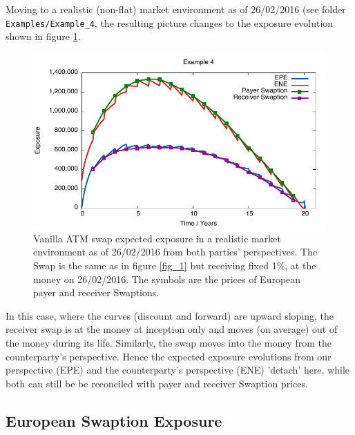 \documentclass[12pt, a4paper]{article}
\begin{document}
\medskip
Moving to a realistic (non-flat) market environment as of 26/02/2016 (see folder {\tt Examples/Example\_4}, the resulting picture changes to the exposure evolution 
shown in figure \ref{fig_2}.
\begin{figure}[hbt]
\begin{center}
\includegraphics[scale=1.0]{example_swap_3.pdf}
\end{center}
\caption{Vanilla ATM swap expected exposure in a realistic market environment as of 26/02/2016 from both parties' perspectives. The Swap is the same as in figure \ref{fig_1} but receiving fixed 1\%, at the money on 26/02/2016. The symbols are the prices of European payer and receiver Swaptions.}
\label{fig_2}
\end{figure}
In this case, where the curves (discount and forward) are upward sloping, the receiver swap is at the money at inception only and moves (on average) out of the money during its life. Similarly, the swap moves into the money from the counterparty's perspective. Hence the expected exposure evolutions from our perspective (EPE) and the counterparty's perspective (ENE) 'detach' here, while both can still be be reconciled with payer and receiver Swaption prices.

\subsection{European Swaption Exposure}
\end{document}

